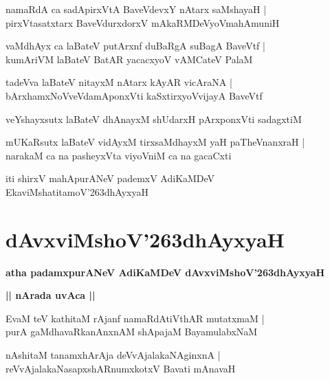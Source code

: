 \documentclass[twoside,12pt,openright]{book}
\def\S{\char'263}
\newcounter{shloka}[chapter]
\def\uvaca#1{\centerline{{\large\textbf{#1}}}}
\begin{document}
\begin{shloka}
namaRdA ca sadApirxVtA BaveVdevxY nAtarx saMshayaH |\\
pirxVtasatxtarx BaveVdurxdorxV mAkaRMDeVyoVmahAmuniH 
\end{shloka}

\begin{shloka}
vaMdhAyx ca laBateV putArxnf duBaRgA suBagA BaveVtf |\\
kumAriVM laBateV BatAR yacacxyoV vAMCateV PalaM 
\end{shloka}

\begin{shloka}
tadeVva laBateV nitayxM  nAtarx kAyAR vicAraNA |\\
bArxhamxNoVveVdamAponxVti kaSxtirxyoVvijayA BaveVtf 
\end{shloka}

\begin{shloka}
veYshayxsutx laBateV dhAnayxM shUdarxH pArxponxVti sadagxtiM 
\end{shloka}

\begin{shloka}
mUKaRsutx laBateV vidAyxM tirxsaMdhayxM  yaH paTheVnanxraH |\\
narakaM ca na pasheyxVta viyoVniM ca na gacaCxti
\end{shloka}

\begin{center}
iti shirxV mahApurANeV pademxV AdiKaMDeV EkaviMshatitamoV\S dhAyxyaH
\end{center}

\chapter{dAvxviMshoV\S dhAyxyaH}

\begin{center}
{\LARGE\bfseries atha padamxpurANeV AdiKaMDeV dAvxviMshoV\S dhAyxyaH}
\end{center}

\uvaca{|| nArada uvAca ||}

\begin{shloka}
EvaM teV kathitaM rAjanf namaRdAtiVthAR mutatxmaM |\\
purA gaMdhavaRkanAnxnAM shApajaM BayamulabxNaM 
\end{shloka}

\begin{shloka}
nAshitaM tanamxhArAja deVvAjalakaNAginxnA |\\
reVvAjalakaNasapxshARnumxkotxV Bavati mAnavaH 
\end{shloka}
\end{document}
